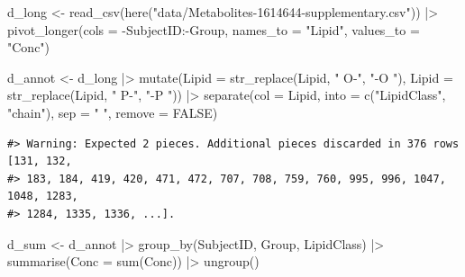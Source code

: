 \documentclass[
  letterpaper,
  DIV=11,
  numbers=noendperiod]{scrreprt}
\newenvironment{Shaded}{\begin{snugshade}}{\end{snugshade}}
\newcommand{\AttributeTok}[1]{\textcolor[rgb]{0.40,0.45,0.13}{#1}}
\newcommand{\ConstantTok}[1]{\textcolor[rgb]{0.56,0.35,0.01}{#1}}
\newcommand{\FunctionTok}[1]{\textcolor[rgb]{0.28,0.35,0.67}{#1}}
\newcommand{\NormalTok}[1]{\textcolor[rgb]{0.00,0.23,0.31}{#1}}
\newcommand{\OtherTok}[1]{\textcolor[rgb]{0.00,0.23,0.31}{#1}}
\newcommand{\SpecialCharTok}[1]{\textcolor[rgb]{0.37,0.37,0.37}{#1}}
\newcommand{\StringTok}[1]{\textcolor[rgb]{0.13,0.47,0.30}{#1}}
\begin{document}
\begin{Shaded}
\begin{Highlighting}[]
\NormalTok{d\_long }\OtherTok{\textless{}{-}} \FunctionTok{read\_csv}\NormalTok{(}\FunctionTok{here}\NormalTok{(}\StringTok{"data/Metabolites{-}1614644{-}supplementary.csv"}\NormalTok{)) }\SpecialCharTok{|\textgreater{}} 
  \FunctionTok{pivot\_longer}\NormalTok{(}\AttributeTok{cols =} \SpecialCharTok{{-}}\NormalTok{SubjectID}\SpecialCharTok{:{-}}\NormalTok{Group, }\AttributeTok{names\_to =} \StringTok{"Lipid"}\NormalTok{, }\AttributeTok{values\_to =} \StringTok{"Conc"}\NormalTok{)}

\NormalTok{d\_annot }\OtherTok{\textless{}{-}}\NormalTok{ d\_long }\SpecialCharTok{|\textgreater{}} 
  \FunctionTok{mutate}\NormalTok{(}\AttributeTok{Lipid =} \FunctionTok{str\_replace}\NormalTok{(Lipid, }\StringTok{" O{-}"}\NormalTok{, }\StringTok{"{-}O "}\NormalTok{), }
         \AttributeTok{Lipid =} \FunctionTok{str\_replace}\NormalTok{(Lipid, }\StringTok{" P{-}"}\NormalTok{, }\StringTok{"{-}P "}\NormalTok{)) }\SpecialCharTok{|\textgreater{}} 
  \FunctionTok{separate}\NormalTok{(}\AttributeTok{col =}\NormalTok{ Lipid, }\AttributeTok{into =} \FunctionTok{c}\NormalTok{(}\StringTok{"LipidClass"}\NormalTok{, }\StringTok{"chain"}\NormalTok{), }\AttributeTok{sep =} \StringTok{" "}\NormalTok{, }\AttributeTok{remove =} \ConstantTok{FALSE}\NormalTok{) }
\end{Highlighting}
\end{Shaded}

\begin{verbatim}
#> Warning: Expected 2 pieces. Additional pieces discarded in 376 rows [131, 132,
#> 183, 184, 419, 420, 471, 472, 707, 708, 759, 760, 995, 996, 1047, 1048, 1283,
#> 1284, 1335, 1336, ...].
\end{verbatim}

\begin{Shaded}
\begin{Highlighting}[]
\NormalTok{d\_sum }\OtherTok{\textless{}{-}}\NormalTok{ d\_annot }\SpecialCharTok{|\textgreater{}} 
  \FunctionTok{group\_by}\NormalTok{(SubjectID, Group, LipidClass) }\SpecialCharTok{|\textgreater{}} 
  \FunctionTok{summarise}\NormalTok{(}\AttributeTok{Conc =} \FunctionTok{sum}\NormalTok{(Conc)) }\SpecialCharTok{|\textgreater{}}  
  \FunctionTok{ungroup}\NormalTok{()}
\end{Highlighting}
\end{Shaded}
\end{document}
